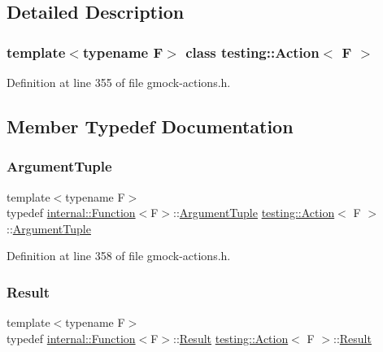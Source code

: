 \subsection{Detailed Description}
\subsubsection*{template$<$typename F$>$\newline
class testing\+::\+Action$<$ F $>$}



Definition at line 355 of file gmock-\/actions.\+h.



\subsection{Member Typedef Documentation}
\mbox{\label{classtesting_1_1Action_ae27fda510696a9294f991de5b1abfaf2}} 
\subsubsection{\texorpdfstring{Argument\+Tuple}{ArgumentTuple}}
{\footnotesize\ttfamily template$<$typename F$>$ \\
typedef \hyperlink{structtesting_1_1internal_1_1Function}{internal\+::\+Function}$<$F$>$\+::\hyperlink{classtesting_1_1Action_ae27fda510696a9294f991de5b1abfaf2}{Argument\+Tuple} \hyperlink{classtesting_1_1Action}{testing\+::\+Action}$<$ F $>$\+::\hyperlink{classtesting_1_1Action_ae27fda510696a9294f991de5b1abfaf2}{Argument\+Tuple}}



Definition at line 358 of file gmock-\/actions.\+h.

\mbox{\label{classtesting_1_1Action_a9af08a21ad329331fde856cba9b6dea2}} 
\subsubsection{\texorpdfstring{Result}{Result}}
{\footnotesize\ttfamily template$<$typename F$>$ \\
typedef \hyperlink{structtesting_1_1internal_1_1Function}{internal\+::\+Function}$<$F$>$\+::\hyperlink{classtesting_1_1Action_a9af08a21ad329331fde856cba9b6dea2}{Result} \hyperlink{classtesting_1_1Action}{testing\+::\+Action}$<$ F $>$\+::\hyperlink{classtesting_1_1Action_a9af08a21ad329331fde856cba9b6dea2}{Result}}



